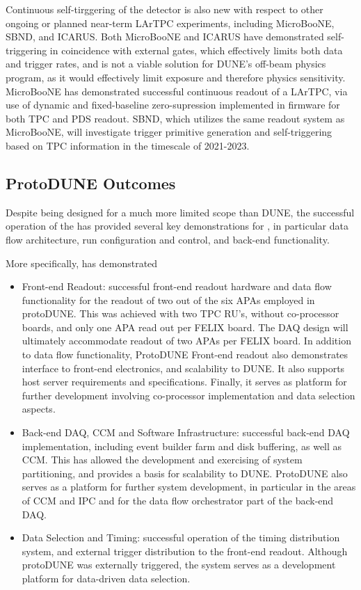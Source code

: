 Continuous self-tirggering of the detector is also new with respect to
other ongoing or planned near-term LArTPC experiments, including
MicroBooNE, SBND, and ICARUS. Both MicroBooNE and ICARUS have demonstrated
self-triggering in coincidence with external gates, which effectively
limits both data and trigger rates, and is not a viable solution for
DUNE's off-beam physics program, as it would effectively limit
exposure and therefore physics sensitivity. %
MicroBooNE has demonstrated successful continuous readout of a LArTPC,
via use of dynamic and fixed-baseline zero-supression implemented in
firmware for both TPC and PDS readout. SBND, which utilizes the same readout
system as MicroBooNE, will investigate trigger primitive generation
and self-triggering based on TPC information in the timescale of 2021-2023.


\subsection{ProtoDUNE Outcomes}

Despite being designed for a much more limited scope than DUNE, the %
successful operation of the   has provided several key
demonstrations for  , in particular data flow
architecture, run configuration and control, and back-end
functionality. %

More specifically,  has demonstrated 
\begin{itemize}
\item Front-end Readout: successful
front-end readout hardware and data flow functionality for the readout
of two out of the six APAs employed in protoDUNE. This was achieved
with two TPC RU's, without co-processor boards, and only one APA read
out per FELIX board. The  DAQ design will ultimately
accommodate readout of two APAs per FELIX board. In addition to data
flow functionality, ProtoDUNE Front-end readout also demonstrates interface to
front-end electronics, and scalability to DUNE. It also supports
host server requirements and specifications. Finally, it serves as
platform for further development involving co-processor implementation
and data selection aspects.
\item Back-end DAQ, CCM and Software Infrastructure:
 successful back-end DAQ implementation, including event builder
  farm and disk buffering, as well as CCM. This has allowed the
  development and exercising of system partitioning, and provides a
  basis for scalability to DUNE. ProtoDUNE also serves as
  a platform for further system development, in particular in the
  areas of CCM and IPC and for the data flow orchestrator part of the
  back-end DAQ.
\item Data Selection and Timing: successful operation of the timing
  distribution system, and external trigger distribution to the
  front-end readout. Although protoDUNE was externally triggered, the
  system serves as a development platform for data-driven data selection.
\end{itemize}

